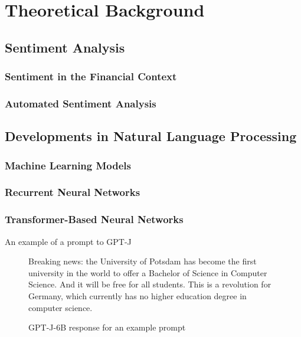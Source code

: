 \section{Theoretical Background}

\subsection{Sentiment Analysis}  %
\subsubsection{Sentiment in the Financial Context}
\subsubsection{Automated Sentiment Analysis}



\subsection{Developments in Natural Language Processing}
\subsubsection{Machine Learning Models}
\subsubsection{Recurrent Neural Networks}
\subsubsection{Transformer-Based Neural Networks}



An example of a prompt to GPT-J \cite{gpt-j}
	
\begin{figure}[!ht]
	\centering
	\begin{tcolorbox}[colframe=up-blue,title=Prompt: ``Breaking news: the University of Potsdam'',width=0.9\textwidth]
		Breaking news: the University of Potsdam has become the first university in the world to offer a Bachelor of Science in Computer Science. And it will be free for all students. This is a revolution for Germany, which currently has no higher education degree in computer science.
	\end{tcolorbox}
	\caption{GPT-J-6B response for an example prompt}
	\label{example_prompt}
\end{figure}



